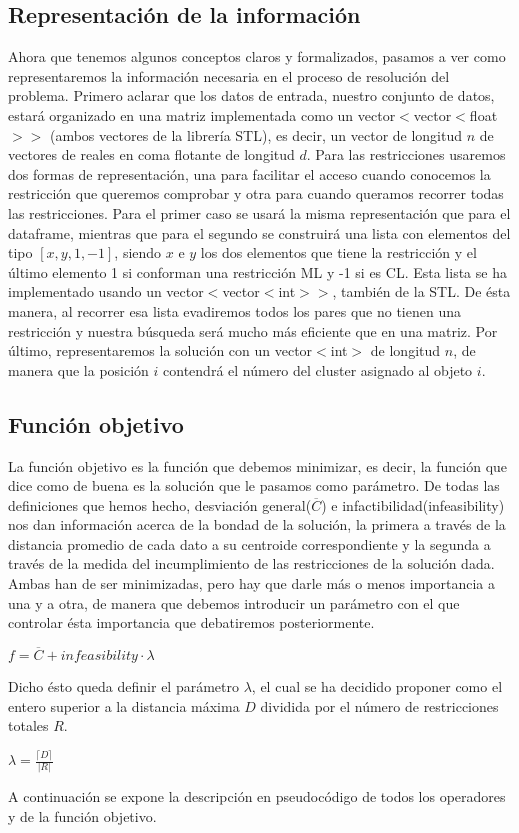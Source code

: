 \documentclass{article}
\providecommand{\abs}[1]{\lvert#1\rvert}
\begin{document}
	\subsection{Representación de la información}
	Ahora que tenemos algunos conceptos claros y formalizados, pasamos a ver como representaremos
	la información necesaria en el proceso de resolución del problema.
	Primero aclarar que los datos de entrada, nuestro conjunto de datos, estará organizado en una matriz
	implementada como un vector$<$vector$<$float$>>$ (ambos vectores de la librería STL), es decir, un
	vector de longitud $n$ de vectores de reales en coma flotante de longitud $d$.
	Para las restricciones usaremos dos formas de representación, una para facilitar el acceso cuando
	conocemos la restricción que queremos comprobar y otra para cuando queramos recorrer todas las
	restricciones. Para el primer caso se usará la misma representación que para el dataframe, mientras
	que para el segundo se construirá una lista con elementos del tipo $[x,y,{1,-1}]$, siendo $x$ e $y$ los dos
	elementos que tiene la restricción y el último elemento 1 si conforman una restricción ML y -1 si es
	CL. Esta lista se ha implementado usando un vector$<$vector$<$int$>>$, también de la STL. De ésta
	manera, al recorrer esa lista evadiremos todos los pares que no tienen una restricción y nuestra
	búsqueda será mucho más eficiente que en una matriz.
	Por último, representaremos la solución con un vector$<$int$>$ de longitud $n$, de manera que la
	posición $i$ contendrá el número del cluster asignado al objeto $i$.
	
	\subsection{Función objetivo}
	La función objetivo es la función que debemos minimizar, es decir, la función que dice como de
	buena es la solución que le pasamos como parámetro.
	De todas las definiciones que hemos hecho, desviación general($\overline{C}$) e infactibilidad(infeasibility)
	nos dan información acerca de la bondad de la solución, la primera a través de la distancia promedio
	de cada dato a su centroide correspondiente y la segunda a través de la medida del incumplimiento
	de las restricciones de la solución dada. Ambas han de ser minimizadas, pero hay que darle más o
	menos importancia a una y a otra, de manera que debemos introducir un parámetro con el que
	controlar ésta importancia que debatiremos posteriormente.\par
	{\centering $f = \overline{C}+infeasibility\cdot \lambda$\par}
	Dicho ésto queda definir el parámetro $\lambda$, el cual se ha decidido proponer como el entero superior a
	la distancia máxima $D$ dividida por el número de restricciones totales $R$.\par
	{\centering $\lambda = \frac{\lceil D \rceil}{\abs{R}}$\par}
	A continuación se expone la descripción en pseudocódigo de todos los operadores y de la función
	objetivo.
	
\end{document}
